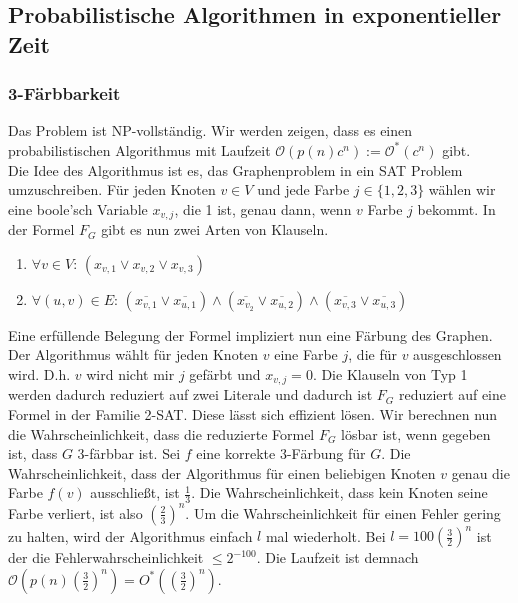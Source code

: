 \documentclass[a4paper, 12pt]{article}
\theoremstyle{plain}
\theoremstyle{definition}
\theoremstyle{lemma}
\theoremstyle{remark}
\theoremstyle{corollary}
\theoremstyle{example}
\begin{document}
	\subsection{Probabilistische Algorithmen in exponentieller Zeit}
	\subsubsection{3-Färbbarkeit}
	Das Problem ist NP-vollständig. Wir werden zeigen, dass es einen probabilistischen Algorithmus mit Laufzeit $\mathcal{O}(p(n)c^n) := \mathcal{O}^*(c^n)$ gibt.\\
	Die Idee des Algorithmus ist es, das Graphenproblem in ein SAT Problem umzuschreiben. Für jeden Knoten $v \in V$ und jede Farbe $j \in \{1,2,3\}$ wählen wir eine boole'sch Variable $x_{v,j}$, die 1 ist, genau dann, wenn $v$ Farbe $j$ bekommt. In der Formel $F_G$ gibt es nun zwei Arten von Klauseln.
	\begin{enumerate}
		\item $\forall v \in V$: $(x_{v,1} \lor x_{v,2} \lor x_{v,3})$
		\item $\forall (u,v) \in E$: $(\overline{x_{v,1}} \lor \overline{x_{u,1}}) \land (\overline{x_{v_2}} \lor \overline{x_{u,2}}) \land (\overline{x_{v,3}} \lor \overline{x_{u,3}})$
	\end{enumerate}
	Eine erfüllende Belegung der Formel impliziert nun eine Färbung des Graphen.\\
	Der Algorithmus wählt für jeden Knoten $v$ eine Farbe $j$, die für $v$ ausgeschlossen wird. D.h. $v$ wird nicht mir $j$ gefärbt und $x_{v,j}=0$. Die Klauseln von Typ 1 werden dadurch reduziert auf zwei Literale und dadurch ist $F_G$ reduziert auf eine Formel in der Familie 2-SAT. Diese lässt sich effizient lösen. Wir berechnen nun die Wahrscheinlichkeit, dass die reduzierte Formel $F_G$ lösbar ist, wenn gegeben ist, dass $G$ 3-färbbar ist. Sei $f$ eine korrekte 3-Färbung für $G$. Die Wahrscheinlichkeit, dass der Algorithmus für einen beliebigen Knoten $v$ genau die Farbe $f(v)$ ausschließt, ist $\frac{1}{3}$. Die Wahrscheinlichkeit, dass kein Knoten seine Farbe verliert, ist also $\left(\frac{2}{3}\right)^n$. Um die Wahrscheinlichkeit für einen Fehler gering zu halten, wird der Algorithmus einfach $l$ mal wiederholt. Bei $l=100\left(\frac{3}{2}\right)^n$ ist der die Fehlerwahrscheinlichkeit $\leq 2^{-100}$. Die Laufzeit ist demnach $\mathcal{O}(p(n)\left(\frac{3}{2}\right)^n) = O^*(\left(\frac{3}{2}\right)^n)$.
\end{document}
